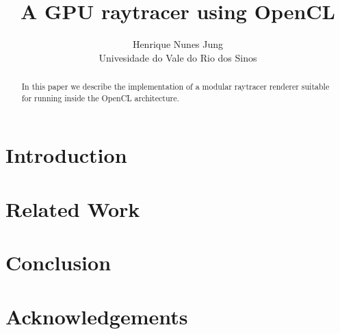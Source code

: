 \documentclass[a4paper]{sbgames}               %
\title{A GPU raytracer using OpenCL}
\author{Henrique Nunes Jung\\ Univesidade do Vale do Rio dos Sinos
}
\begin{document}
\teaser{

}


\maketitle


\begin{abstract}

In this paper we describe the implementation of a modular raytracer renderer suitable for running inside the OpenCL architecture.
\end{abstract}

\keywordlist
\contactlist

\section{Introduction}

\section{Related Work}
\label{sec:related-work}

\section{Conclusion}
\label{sec:conclusion}

\section*{Acknowledgements}




\end{document}
